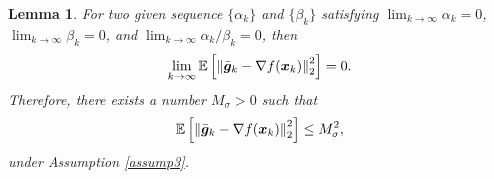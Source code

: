 \documentclass[aos]{imsart}
\numberwithin{equation}{section}
\theoremstyle{plain}
\newtheorem{lemma}{Lemma}
\begin{document}
\begin{appendix}
\begin{lemma}
\label{lemma20}
    For two given sequence $\{\alpha_k\}$ and $\{\beta_k\}$ satisfying $\lim_{k \to \infty} \alpha_k = 0$, $\lim_{k \to \infty} \beta_k = 0$, and $\lim_{k \to \infty} \alpha_{k}/\beta_k = 0$, then
    \begin{equation}
        \lim_{k \to \infty} \mathbb{E} \left[ \left\| \Bar{\bm{g}}_k - \nabla f(\bm{x}_k)\right\|_2^2 \right] = 0. 
    \end{equation}
    Therefore, there exists a number $M_{\sigma}>0$ such that 
    \begin{equation*}
        \mathbb{E} \left[ \left\| \Bar{\bm{g}}_k - \nabla f(\bm{x}_k)\right\|_2^2 \right] \leq M_{\sigma}^2,
    \end{equation*}
    under Assumption \ref{assump3}.
\end{lemma}



\end{appendix}
\end{document}
